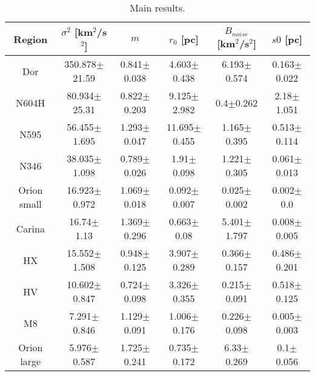 \begin{table*}
\begin{center}
\caption{Main results.}
\begin{tabular}{cccccc}
\hline
  Region & $\sigma^2$ [km$^2$/s$^2$] &              $m$ &        $r_0$ [pc] & $B_{noise}$ [km$^2$/s$^2$] &        $s0$ [pc] \\
\hline
     Dor &         350.878$\pm$21.59 &  0.841$\pm$0.038 &   4.603$\pm$0.438 &            6.193$\pm$0.574 &  0.163$\pm$0.022 \\
   N604H &          80.934$\pm$25.31 &  0.822$\pm$0.203 &   9.125$\pm$2.982 &              0.4$\pm$0.262 &   2.18$\pm$1.051 \\
    N595 &          56.455$\pm$1.695 &  1.293$\pm$0.047 &  11.695$\pm$0.455 &            1.165$\pm$0.395 &  0.513$\pm$0.114 \\
    N346 &          38.035$\pm$1.098 &  0.789$\pm$0.026 &    1.91$\pm$0.098 &            1.221$\pm$0.305 &  0.061$\pm$0.013 \\
  Orion small &          16.923$\pm$0.972 &  1.069$\pm$0.018 &   0.092$\pm$0.007 &            0.025$\pm$0.002 &    0.002$\pm$0.0 \\
    Carina &            16.74$\pm$1.13 &  1.369$\pm$0.296 &    0.663$\pm$0.08 &            5.401$\pm$1.797 &  0.008$\pm$0.005 \\
      HX &          15.552$\pm$1.508 &  0.948$\pm$0.125 &   3.907$\pm$0.289 &            0.366$\pm$0.157 &  0.486$\pm$0.201 \\
      HV &          10.602$\pm$0.847 &  0.724$\pm$0.098 &   3.326$\pm$0.355 &            0.215$\pm$0.091 &  0.518$\pm$0.125 \\
      M8 &           7.291$\pm$0.846 &  1.129$\pm$0.091 &   1.006$\pm$0.176 &            0.226$\pm$0.098 &  0.005$\pm$0.003 \\
 Orion large &           5.976$\pm$0.587 &  1.725$\pm$0.241 &   0.735$\pm$0.172 &             6.33$\pm$0.269 &    0.1$\pm$0.056 \\
\hline

\end{tabular}\label{tab:Res}
\end{center}
\end{table*}
